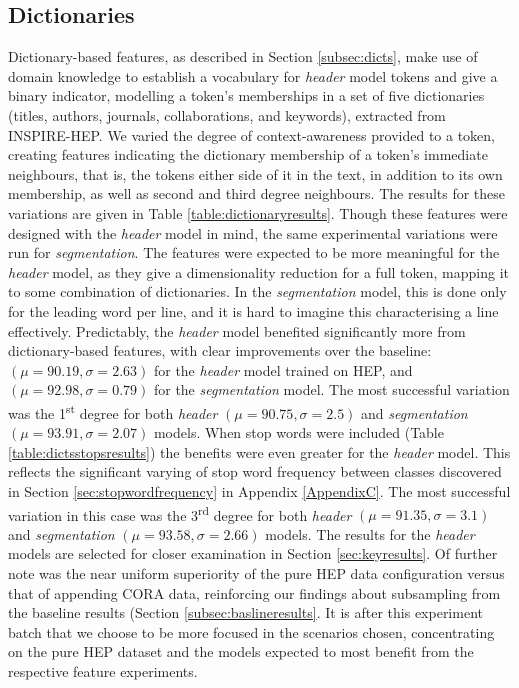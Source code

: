 \subsection{Dictionaries}
\label{subsec:dictionaries}
Dictionary-based features, as described in Section \ref{subsec:dicts}, make use of domain knowledge to establish a vocabulary for \emph{header} model tokens and give a binary indicator, modelling a token's memberships in a set of five dictionaries (titles, authors, journals, collaborations, and keywords), extracted from INSPIRE-HEP. We varied the degree of context-awareness provided to a token, creating features indicating the dictionary membership of a token's immediate neighbours, that is, the tokens either side of it in the text, in addition to its own membership, as well as second and third degree neighbours. The results for these variations are given in Table \ref{table:dictionaryresults}. Though these features were designed with the \emph{header} model in mind, the same experimental variations were run for \emph{segmentation}. The features were expected to be more meaningful for the \emph{header} model, as they give a dimensionality reduction for a full token, mapping it to some combination of dictionaries. In the \emph{segmentation} model, this is done only for the leading word per line, and it is hard to imagine this characterising a line effectively. Predictably, the \emph{header} model benefited significantly more from dictionary-based features, with clear improvements over the baseline: $(\mu =  90.19, \sigma = 2.63)$ for the \emph{header} model trained on HEP, and $(\mu =  92.98, \sigma = 0.79)$ for the \emph{segmentation} model. The most successful variation was the 1\textsuperscript{st} degree for both \emph{header} $(\mu = 90.75, \sigma = 2.5)$ and \emph{segmentation} $(\mu = 93.91, \sigma = 2.07)$ models. When stop words were included (Table \ref{table:dictsstopsresults}) the benefits were even greater for the \emph{header} model. This reflects the significant varying of stop word frequency between classes discovered in Section \ref{sec:stopwordfrequency} in Appendix \ref{AppendixC}. The most successful variation in this case was the 3\textsuperscript{rd} degree for both \emph{header} $(\mu = 91.35, \sigma = 3.1)$ and \emph{segmentation} $(\mu = 93.58, \sigma = 2.66)$ models. The results for the \emph{header} models are selected for closer examination in Section \ref{sec:keyresults}. Of further note was the near uniform superiority of the pure HEP data configuration versus that of appending CORA data, reinforcing our findings about subsampling from the baseline results (Section \ref{subsec:baslineresults}. It is after this experiment batch that we choose to be more focused in the scenarios chosen, concentrating on the pure HEP dataset and the models expected to most benefit from the respective feature experiments.

